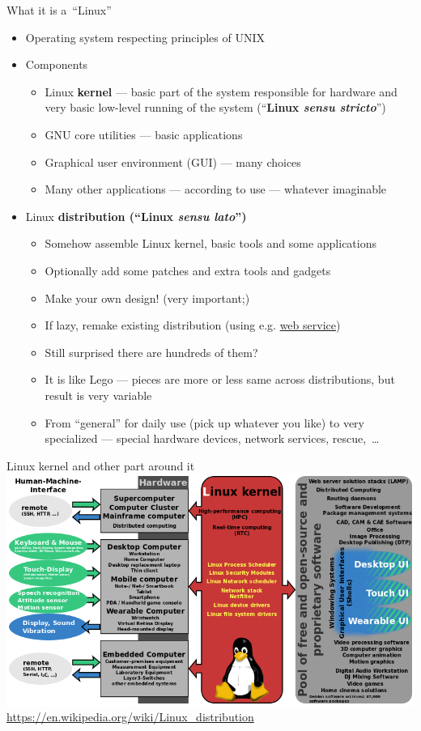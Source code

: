 \documentclass[compress, ucs, xelatex, 11pt, xcolor=svgnames,
  hyperref={
    bookmarks=true,
    unicode=true,
    colorlinks=true,
    pdftitle={Linux, command line and MetaCentrum},
    plainpages=false,
    pdfauthor={Vojtech Zeisek},
    pdfsubject={Course about use of Linux command line, writing shell scripts and using MetaCentrum of CESNET},
    pdfcreator={XeLaTeX},
    pdfkeywords={Linux, GNU, BASH, shell, command line, MetaCentrum},
    linkcolor=DarkRed,
    anchorcolor=DarkBlue,
    citecolor=Indigo,
    filecolor=NavyBlue,
    menucolor=DarkMagenta,
    urlcolor=DarkBlue,
    pdftex},
  url={hyphens, lowtilde} %
  ]{beamer}
\begin{document}
\begin{frame}{What it is a~``Linux''}
  \begin{itemize}
    \item Operating system respecting principles of UNIX
    \item Components
    \begin{itemize}
      \item Linux \textbf{kernel} --- basic part of the system responsible for hardware and very basic low-level running of the system (``\textbf{Linux \textit{sensu stricto}}'')
      \item GNU core utilities --- basic applications
      \item Graphical user environment (GUI) --- many choices
      \item Many other applications --- according to use --- whatever imaginable
    \end{itemize}
    \item Linux \textbf{distribution (``Linux \textit{sensu lato}'')}
    \begin{itemize}
      \item Somehow assemble Linux kernel, basic tools and some applications
      \item Optionally add some patches and extra tools and gadgets
      \item Make your own design! (very important;)
      \item If lazy, remake existing distribution (using e.g. \href{http://openbuildservice.org/}{web service})
      \item Still surprised there are hundreds of them?
      \item It is like Lego --- pieces are more or less same across distributions, but result is very variable
      \item From ``general'' for daily use (pick up whatever you like) to very specialized --- special hardware devices, network services, rescue,~\ldots
    \end{itemize}
  \end{itemize}
\end{frame}

\begin{frame}{Linux kernel and other part around it}
  \includegraphics[width=\textwidth]{linux_kernel_ubiquity.png}
  \vfil
  \url{https://en.wikipedia.org/wiki/Linux_distribution}
  \vfill
\end{frame}
\end{document}
